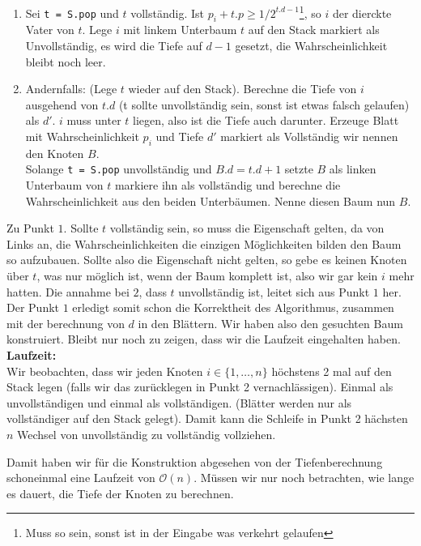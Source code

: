 \documentclass[11pt,a4paper,ngerman]{article}
\begin{document}
\begin{enumerate}
	\item Sei \lstinline|t = S.pop| und $t$ vollständig. Ist $p_i + t.p \geq 1 / 2^{t.d - 1}$\footnote{Muss so sein,
	sonst ist in der Eingabe was verkehrt gelaufen}, so $i$ der dierckte Vater von $t$. Lege $i$ mit linkem 		
		Unterbaum $t$ auf den Stack markiert als Unvollständig, es wird die Tiefe auf $d-1$ gesetzt, die Wahrscheinlichkeit bleibt noch leer.
	\item Andernfalls: (Lege $t$ wieder auf den Stack). Berechne die Tiefe von $i$ ausgehend von $t.d$ (t sollte unvollständig sein, sonst
		ist etwas falsch gelaufen) als $d'$. $i$ muss unter $t$ liegen, also ist die Tiefe auch darunter. Erzeuge Blatt mit Wahrscheinlichkeit $p_i$ und
		Tiefe $d'$ markiert als Vollständig wir nennen den Knoten $B$.\\

		Solange \lstinline|t = S.pop| unvollständig und $B.d = t.d+1$ setzte $B$ als linken Unterbaum von $t$ markiere ihn als vollständig
		und berechne die Wahrscheinlichkeit aus den beiden Unterbäumen. Nenne diesen Baum nun $B$.
\end{enumerate}

Zu Punkt $1$. Sollte $t$ vollständig sein, so muss die Eigenschaft gelten, da von Links an, die Wahrscheinlichkeiten die einzigen Möglichkeiten bilden den Baum so aufzubauen. Sollte also die Eigenschaft nicht gelten, so gebe es keinen Knoten über $t$, was nur möglich ist, wenn der Baum komplett ist, also wir gar kein $i$ mehr hatten. Die annahme bei $2$, dass $t$ unvollständig ist, leitet sich aus Punkt $1$ her.\\

Der Punkt $1$ erledigt somit schon die Korrektheit des Algorithmus, zusammen mit der berechnung von $d$ in den Blättern. Wir haben also den gesuchten Baum konstruiert. Bleibt nur noch zu zeigen, dass wir die Laufzeit eingehalten haben.\\

\noindent\textbf{Laufzeit:}\\
Wir beobachten, dass wir jeden Knoten $i \in \{1, \ldots, n\}$ höchstens 2 mal auf den Stack legen (falls wir das zurücklegen in Punkt 2 vernachlässigen). Einmal als unvollständigen und einmal als vollständigen. (Blätter werden nur als vollständiger auf den Stack gelegt). Damit kann die Schleife in Punkt 2 hächsten $n$ Wechsel von unvollständig zu vollständig vollziehen.

Damit haben wir für die Konstruktion abgesehen von der Tiefenberechnung schoneinmal eine Laufzeit von $\mathcal{O}(n)$. Müssen wir nur noch betrachten, wie lange es dauert, die Tiefe der Knoten zu berechnen.\\
\end{document}
